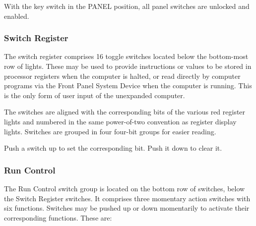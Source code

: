 \documentclass[11pt,a4paper,twocolumns]{article}
\newcommand{\sw}[1]{\textsf{#1}}
\begin{document}
With the key switch in the \sw{PANEL} position, all panel switches are unlocked
and enabled.

\subsubsection{Switch Register}

The switch register comprises 16 toggle switches located below the bottom-most
row of lights. These may be used to provide instructions or values to be stored
in processor registers when the computer is halted, or read directly by
computer programs via the Front Panel System Device when the computer is
running. This is the only form of user input of the unexpanded computer.

The switches are aligned with the corresponding bits of the various red
register lights and numbered in the same power-of-two convention as register
display lights. Switches are grouped in four four-bit groups for easier
reading.

Push a switch up to set the corresponding bit. Push it down to clear it.

\subsubsection{Run Control}

The Run Control switch group is located on the bottom row of switches,
below the Switch Register switches. It comprises three momentary
action switches with six functions. Switches may be pushed up or down
momentarily to activate their corresponding functions. These are:
\end{document}
